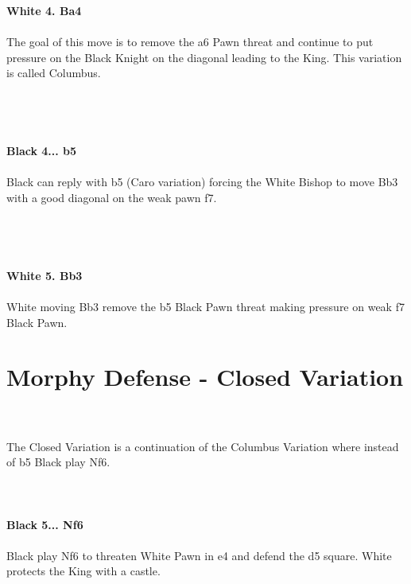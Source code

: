 \documentclass{article}
\begin{document}
\\

\\
\\
\textbf{White 4. Ba4}\\
\\
The goal of this move is to remove the a6 Pawn threat and continue to put pressure on the Black Knight on the diagonal leading to the King. This variation is called Columbus.\\\\
\\

\\
\\
\textbf{Black 4... b5}\\
\\
Black can reply with b5 (Caro variation) forcing the White Bishop to move Bb3 with a good diagonal on the weak pawn f7.\\\\
\\

\\
\\
\textbf{White 5. Bb3}\\
\\
White moving Bb3 remove the b5 Black Pawn threat making pressure on weak f7 Black Pawn.\\\section{ Morphy Defense - Closed Variation}

\\
\\
The Closed Variation is a continuation of the Columbus Variation where instead of b5 Black play Nf6.\\
\\

\\
\\
\textbf{Black 5... Nf6}\\
\\
Black play Nf6 to threaten White Pawn in e4 and defend the d5 square. White protects the King with a castle.\\\\
\\

\\
\end{document}
